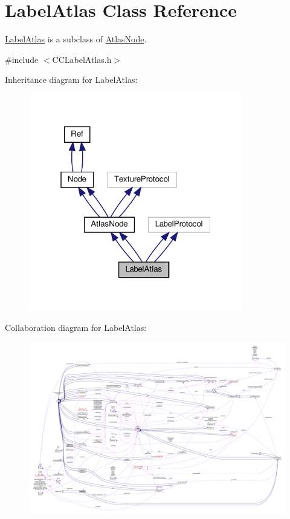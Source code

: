 \hypertarget{classLabelAtlas}{}\section{Label\+Atlas Class Reference}
\label{classLabelAtlas}


\hyperlink{classLabelAtlas}{Label\+Atlas} is a subclass of \hyperlink{classAtlasNode}{Atlas\+Node}.  




{\ttfamily \#include $<$C\+C\+Label\+Atlas.\+h$>$}



Inheritance diagram for Label\+Atlas\+:
\nopagebreak
\begin{figure}[H]
\begin{center}
\leavevmode
\includegraphics[width=265pt]{classLabelAtlas__inherit__graph}
\end{center}
\end{figure}


Collaboration diagram for Label\+Atlas\+:
\nopagebreak
\begin{figure}[H]
\begin{center}
\leavevmode
\includegraphics[width=350pt]{classLabelAtlas__coll__graph}
\end{center}
\end{figure}

